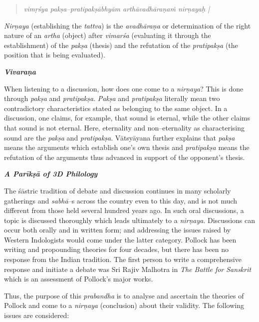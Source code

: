 \begin{verse}
\textit{vimṛśya pakṣa–pratipakṣābhyām arthāvadhāraṇaṁ nirṇayaḥ |}
\end{verse}

\textit{Nirṇaya} (establishing the \textit{tattva}) is the \textit{avadhāraṇa} or determination of the right nature of an \textit{artha} (object) after \textit{vimarśa} (evaluating it through the establishment) of the \textit{pakṣa} (thesis) and the refutation of the \textit{pratipakṣa} (the position that is being evaluated).

\textit{\textbf{Vivaraṇa}}

When listening to a discussion, how does one come to a \textit{nirṇaya}? This is done through \textit{pakṣa} and \textit{pratipakṣa}. \textit{Pakṣa} and \textit{pratipakṣa} literally mean two contradictory characteristics stated as belonging to the same object. In a discussion, one claims, for example, that sound is eternal, while the other claims that sound is not eternal. Here, eternality and non–eternality as characterising sound are the \textit{pakṣa} and \textit{pratipakṣa}. Vātsyāyana further explains that \textit{pakṣa} means the arguments which establish one's own thesis and \textit{pratipakṣa }means the refutation of the arguments thus advanced in support of the opponent's thesis.

\textbf{\textit{A Parīkṣā of 3D Philology}}

The śāstric tradition of debate and discussion continues in many scholarly gatherings and \textit{sabhā}–s across the country even to this day, and is not much different from those held several hundred years ago. In such oral discussions, a topic is discussed thoroughly which leads ultimately to a \textit{nirṇaya}. Discussions can occur both orally and in written form; and addressing the issues raised by Western Indologists would come under the latter category. Pollock has been writing and propounding theories for four decades, but there has been no response from the Indian tradition. The first person to write a comprehensive response and initiate a debate was Sri Rajiv Malhotra in \textit{The Battle for Sanskrit }which is an assessment of Pollock’s major works.

Thus, the purpose of this \textit{prabandha} is to analyse and ascertain the theories of Pollock and come to a \textit{nirṇaya} (conclusion) about their validity. The following issues are considered:

